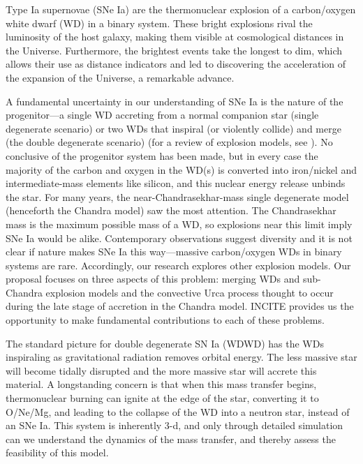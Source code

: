 Type Ia supernovae (SNe Ia) are the thermonuclear explosion of a
carbon/oxygen white dwarf (WD) in a binary system.  These bright
explosions rival the luminosity of the host galaxy, making them
visible at cosmological distances in the Universe. Furthermore, the
brightest events take the longest to dim, which allows their use as
distance indicators and led to discovering the acceleration of the
expansion of the Universe, a remarkable advance.

A fundamental uncertainty in our understanding of SNe Ia is the nature
of the progenitor---a single WD accreting from a normal companion star
(single degenerate scenario) or two WDs that inspiral (or
violently collide) and merge (the double degenerate scenario) (for a
review of explosion models, see \cite{calder:2013}).  No conclusive of
the progenitor system has been made, but in every case the majority of
the carbon and oxygen in the WD(s) is converted into
iron/nickel and intermediate-mass elements like silicon, and this
nuclear energy release unbinds the star.
For many years, the near-Chandrasekhar-mass single degenerate model
(henceforth the Chandra model) saw the most attention.  The
Chandrasekhar mass is the maximum possible mass of a WD, so
explosions near this limit imply SNe Ia would be alike.  Contemporary
observations suggest diversity and it is not clear if nature makes SNe
Ia this way---massive carbon/oxygen WDs in binary systems are
rare.  Accordingly, our research explores other explosion models. Our
proposal focuses on three aspects of this problem: merging WDs
and sub-Chandra explosion models and the convective Urca
process thought to occur during the late stage of accretion in the
Chandra model.  INCITE provides us the opportunity to make fundamental
contributions to each of these problems.

The standard picture for double degenerate SN Ia (WDWD) has the WDs
inspiraling as gravitational radiation removes orbital energy.
The less massive star will become tidally disrupted and the more
massive star will accrete this material.  A longstanding concern is
that when this mass transfer begins, thermonuclear burning can ignite
at the edge of the star, converting it to O/Ne/Mg, and leading to the
collapse of the WD into a neutron star, instead of an SNe Ia.
This system is inherently 3-d, and only through detailed simulation
can we understand the dynamics of the mass transfer, and thereby
assess the feasibility of this model.

